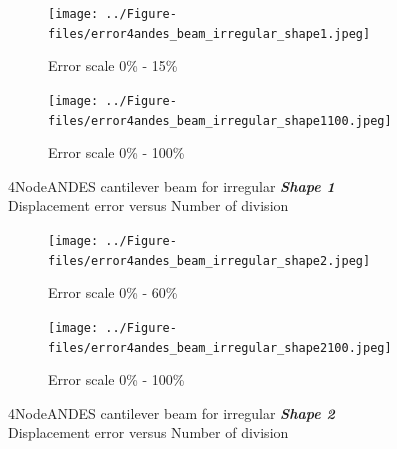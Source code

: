 \documentclass[fleqn,11pt]{article}
\begin{document}
\begin{figure}[H]
  \begin{subfigure}{0.5\textwidth}
    \centering
    \texttt{[image: ../Figure-files/error4andes\_beam\_irregular\_shape1.jpeg]}
    \caption{Error scale 0\% - 15\%}
  \end{subfigure}
  \begin{subfigure}{0.5\textwidth}
    \centering
    \texttt{[image: ../Figure-files/error4andes\_beam\_irregular\_shape1100.jpeg]}
    \caption{Error scale 0\% - 100\%}
  \end{subfigure}
  \captionsetup{justification=centering,margin=2cm}
  \caption{4NodeANDES cantilever beam for irregular \emph{\textbf{Shape 1}}\\
      Displacement error   versus   Number of division}
  \label{fig shape 1 4NodeANDES cantilever beam for irregular more elements}
\end{figure}



\begin{figure}[H]
  \begin{subfigure}{0.5\textwidth}
    \centering
    \texttt{[image: ../Figure-files/error4andes\_beam\_irregular\_shape2.jpeg]}
    \caption{Error scale 0\% - 60\%}
  \end{subfigure}
  \begin{subfigure}{0.5\textwidth}
    \centering
    \texttt{[image: ../Figure-files/error4andes\_beam\_irregular\_shape2100.jpeg]}
    \caption{Error scale 0\% - 100\%}
  \end{subfigure}
  \captionsetup{justification=centering,margin=2cm}
  \caption{4NodeANDES cantilever beam for irregular \emph{\textbf{Shape 2}}\\
      Displacement error   versus   Number of division}
  \label{fig shape 2 4NodeANDES cantilever beam for irregular more elements}
\end{figure}

\end{document}

